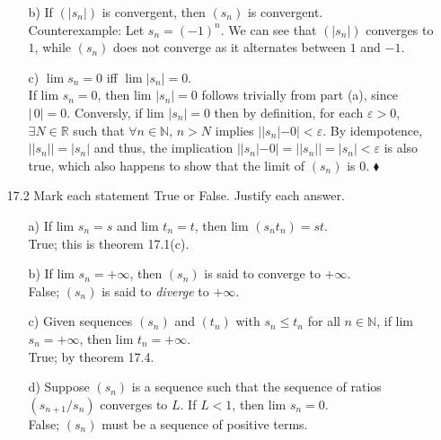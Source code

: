 \documentclass[12pt]{article}
\begin{document}
\begin{enumerate}
\begin{enumerate}
\item[b)] If $(|s_n|)$ is convergent, then $(s_n)$ is convergent.\\
Counterexample: Let $s_n = (-1)^n$. We can see that $(|s_n|)$ converges to $1$, 
while $(s_n)$ does not converge as it alternates between $1$ and $-1$.

\item[c)] $\lim s_n = 0$ iff $\lim |s_n| = 0$. \\
If lim $s_n = 0$, then lim $|s_n| = 0$ follows trivially from part (a), since $|\,0| = 0$.
Conversly, if lim $|s_n| = 0$ then by definition, for each $\varepsilon > 0$, 
$\exists N \in \mathbb{R}$ such that $\forall n \in \mathbb{N}$, $n > N$ implies
$||s_n| - 0| < \varepsilon$. By idempotence, $||s_n|| = |s_n|$ and thus, 
the implication $||s_n| - 0| = ||s_n|| = |s_n| < \varepsilon$ is also true, 
which also happens to show that the limit of $(s_n)$ is $0$. $\blacklozenge$
\end{enumerate}

\item[17.2] Mark each statement True or False. Justify each answer.
\begin{enumerate}
\item[a)] If lim $s_n = s$ and lim $t_n = t$, then lim $(s_nt_n) = st$. \\
True; this is theorem 17.1(c).
\item[b)] If lim $s_n = +\infty$, then $(s_n)$ is said to converge to $+\infty$.\\
False; $(s_n)$ is said to \emph{diverge} to $+\infty$.
\item[c)] Given sequences $(s_n)$ and $(t_n)$ with $s_n \leq t_n$ for all $n \in \mathbb{N}$, if lim $s_n = +\infty$, then lim $t_n = +\infty$. \\
True; by theorem 17.4.
\item[d)] Suppose $(s_n)$ is a sequence such that the sequence of ratios $(s_{n+1}/s_n)$ converges to $L$. If $L < 1$, then lim $s_n = 0$. \\
False; $(s_n)$ must be a sequence of positive terms.
\end{enumerate}


\end{enumerate}
\end{document}
